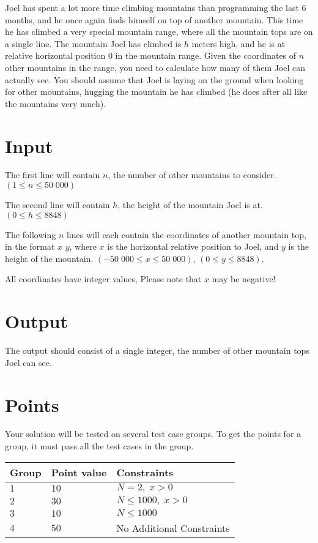 \noindent

Joel has spent a lot more time climbing mountains than programming the last 6 months, and he once again finds himself on top of another mountain.
This time he has climbed a very special mountain range, where all the mountain tops are on a single line. 
The mountain Joel has climbed is $h$ meters high, and he is at relative horizontal position 0 in the mountain range.
Given the coordinates of $n$ other mountains in the range, you need to calculate how many of them Joel can actually see.
You should assume that Joel is laying on the ground when looking for other mountains, hugging the mountain he has climbed (he does after all like the mountains very much).

\section*{Input}
The first line will contain $n$, the number of other mountains to consider. $(1 \leq n \leq 50\;000)$

The second line will contain $h$, the height of the mountain Joel is at. $(0 \leq h \leq 8848)$

The following $n$ lines will each contain the coordinates of another mountain top, in the format $x$ $y$, where $x$ is the horizontal relative position to Joel,
and $y$ is the height of the mountain. $(-50\;000 \leq x \leq 50\;000)$, $(0 \leq y \leq 8848)$.

All coordinates have integer values, Please note that $x$ may be negative!

\section*{Output}
The output should consist of a single integer, the number of other mountain tops Joel can see.

\section*{Points}
Your solution will be tested on several test case groups. To get the points for
a group, it must pass all the test cases in the group.

\noindent
\begin{tabular}{| l | l | p{12cm} |}
  \hline
  \textbf{Group} & \textbf{Point value} & \textbf{Constraints} \\ \hline
  $1$    & $10$       & $N = 2,\;x > 0$ \\ \hline
  $2$    & $30$       & $N \leq 1000,\;x > 0$ \\ \hline
  $3$    & $10$       & $N \leq 1000$ \\ \hline
  $4$    & $50$       & No Additional Constraints \\ \hline
\end{tabular}




